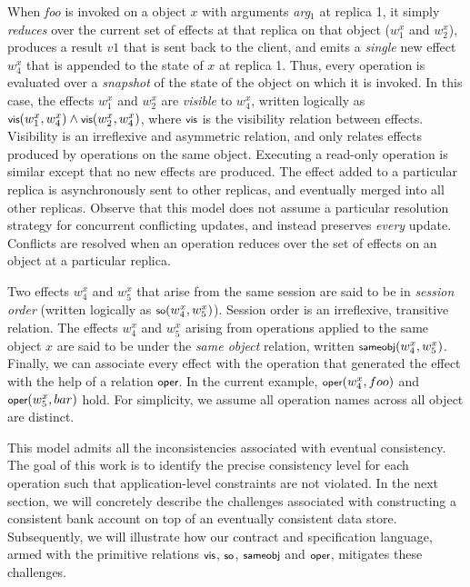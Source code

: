 When \emph{foo} is invoked on a object $x$ with arguments \emph{arg}$_1$ at
replica 1, it simply \emph{reduces} over the current set of effects at that
replica on that object ($w^x_1$ and $w^x_2$), produces a result $v1$ that is
sent back to the client, and emits a \emph{single} new effect $w^x_4$ that is
appended to the state of $x$ at replica 1. Thus, every operation is evaluated
over a \emph{snapshot} of the state of the object on which it is invoked. In
this case, the effects $w^x_1$ and $w^x_2$ are \emph{visible} to $w^x_4$,
written logically as $\small \vis{w^x_1}{w^x_4} \wedge \vis{w^x_2}{w^x_4}$,
where $\small \visZ$ is the visibility relation between effects. Visibility is
an irreflexive and asymmetric relation, and only relates effects produced by
operations on the same object. Executing a read-only operation is similar
except that no new effects are produced. The effect added to a particular
replica is asynchronously sent to other replicas, and eventually merged into
all other replicas. Observe that this model does not assume a particular
resolution strategy for concurrent conflicting updates, and instead preserves
\emph{every} update. Conflicts are resolved when an operation reduces over the
set of effects on an object at a particular replica.

Two effects $w^x_4$ and $w^x_5$ that arise from the same session are said to be
in \emph{session order} (written logically as $\small \so{w^x_4}{w^x_5}$).
Session order is an irreflexive, transitive relation. The effects $w^x_4$ and
$w^x_5$ arising from operations applied to the same object $x$ are said to be
under the \emph{same object} relation, written $\small \sameobj{w^x_4}{w^x_5}$.
Finally, we can associate every effect with the operation that generated the
effect with the help of a relation $\small \operZ$. In the current example,
$\small \oper{w^x_4}{foo}$ and $\small \oper{w^x_5}{bar}$ hold. For simplicity,
we assume all operation names across all object are distinct.

This model admits all the inconsistencies associated with eventual consistency.
The goal of this work is to identify the precise consistency level for each
operation such that application-level constraints are not violated. In the next
section, we will concretely describe the challenges associated with
constructing a consistent bank account on top of an eventually consistent data
store. Subsequently, we will illustrate how our contract and specification
language, armed with the primitive relations $\small \visZ$, $\small \soZ$,
$\small \sameobjZ$ and $\small \operZ$, mitigates these challenges.
